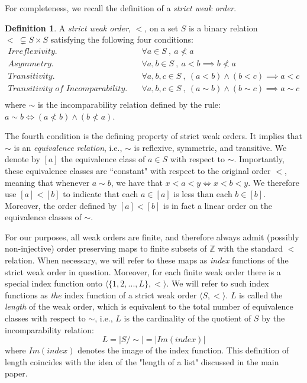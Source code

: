 \documentclass{article}
\theoremstyle{plain}
\theoremstyle{definition}
\newtheorem{definition}[theorem]{Definition}
\theoremstyle{remark}
\begin{document}
For completeness, we recall the definition of a \textit{strict weak order}.
\begin{definition}
	A \textit{strict weak order}, $<$, on a set $S$ is a binary relation $< \ \subsetneq S \times S$ satisfying the following four conditions:
	\begin{equation*}
		\begin{aligned}
			\textit{Irreflexivity.} \qquad &\forall a \in S \ , \ a \nless a\\
			\textit{Asymmetry.} \qquad &\forall a, b \in S \ , \ a < b \implies b \nless a\\
			\textit{Transitivity.} \qquad &\forall a, b, c \in S \ , \ (a < b) \wedge (b < c) \implies a < c\\
			\textit{Transitivity of Incomparability.} \qquad &\forall a, b, c \in S \ , \ (a \sim b) \wedge (b \sim c) \implies a \sim c\\
		\end{aligned}
	\end{equation*}
	where $\sim$ is the incomparability relation defined by the rule: $a \sim b \iff (a \nless b) \wedge (b \nless a)$.
\end{definition}
The fourth condition is the defining property of strict weak orders. It implies that $\sim$ is an \textit{equivalence relation}, i.e., $\sim$ is reflexive, symmetric, and transitive. We denote by $[a]$ the equivalence class of $a \in S$ with respect to $\sim$. Importantly, these equivalence classes are ``constant" with respect to the original order $<$, meaning that whenever $a \sim b$, we have that $x < a < y \iff x < b < y$. We therefore use $[a] < [b]$ to indicate that each $a \in [a]$ is less than each $b \in [b]$. Moreover, the order defined by $[a] < [b]$ is in fact a linear order on the equivalence classes of $\sim$.

For our purposes, all weak orders are finite, and therefore always admit (possibly non-injective) order preserving maps to finite subsets of $\mathbb{Z}$ with the standard $<$ relation. When necessary, we will refer to these maps as \textit{index} functions of the strict weak order in question. Moreover, for each finite weak order there is a special index function onto $\langle \{1, 2, ..., L\}, < \rangle$. We will refer to such index functions as \textit{the} index function of a strict weak order $\langle S, < \rangle$. $L$ is called the \textit{length} of the weak order, which is equivalent to the total number of equivalence classes with respect to $\sim$, i.e., $L$ is the cardinality of the quotient of $S$ by the incomparability relation:
\begin{equation*}
	L = |S / \sim| = |Im(index)|
\end{equation*}
where $Im(index)$ denotes the image of the index function. This definition of length coincides with the idea of the "length of a list" discussed in the main paper.
\end{document}
